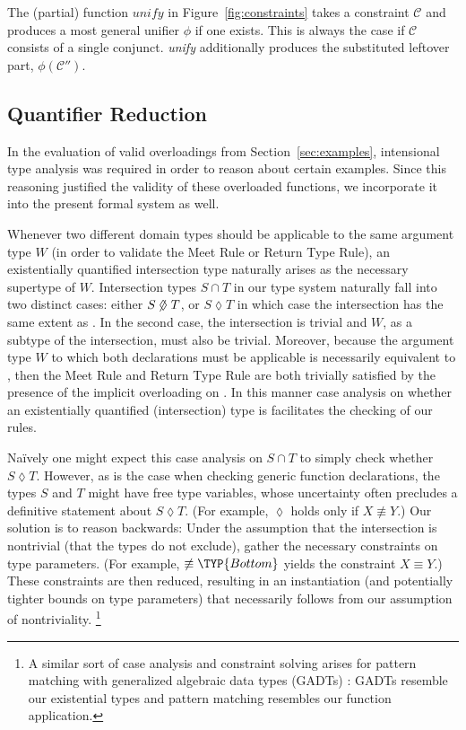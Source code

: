 \documentclass[10pt]{sigplanconf}
\newcommand{\C}{\mathcal{C}}
\newcommand{\exc}{\mathrel{\lozenge}}
\newcommand{\nexc}{\mathrel{\hbox to 0pt{$\mskip -1.4mu\not$\hss}\lozenge}}
\newcommand{\Bottom}{\TYP{Bottom}}
\begin{document}
The (partial) function $\textit{unify}$ in Figure~\ref{fig:constraints} takes a constraint $\C$ and produces a most general unifier $\phi$ if one exists. This is always the case if $\C$ consists of a single conjunct. \textit{unify} additionally produces the substituted leftover
part, $\phi(\C'')$.

\subsection{Quantifier Reduction}
\label{sec:exred}
In the evaluation of valid overloadings from Section~\ref{sec:examples},
intensional type analysis was required in order to reason about certain
examples. Since this reasoning justified
the validity of these overloaded functions, we incorporate it into
the present formal system as well.

Whenever two different domain types should be
applicable to the same argument type $W$ (in order to validate the Meet Rule
or Return Type Rule), an existentially quantified intersection type
naturally arises as the necessary supertype of $W$.
Intersection types $S \cap T$ in our type system naturally fall into two
distinct cases: either $S \nexc T$, or $S \exc T$ in which case the 
intersection has the same extent as \Bottom.
In the second case, the intersection is trivial and $W$, as
a subtype of the intersection, must also be trivial.
Moreover, because the argument type $W$ to which both declarations must be applicable
is necessarily equivalent to \Bottom, then the Meet Rule and Return Type Rule
are both trivially satisfied by the presence of the implicit overloading on
\Bottom. In this manner case analysis on whether an existentially
quantified (intersection) type is \Bottom facilitates the checking of our
rules.

Na\"{i}vely one might expect this case analysis on $S \cap T$ to simply check
whether $S \exc T$. However, as is the case when checking generic
function declarations, the types $S$ and $T$ might have free type variables,
whose uncertainty often precludes a definitive statement about $S \exc T$.
(For example,  $\exc$  holds only if $X \not\equiv Y$.) Our solution is to reason backwards: Under the assumption that the intersection
is nontrivial (that the types do not exclude), gather the necessary
constraints on type parameters. (For example,  $\not\equiv \Bottom$ yields the constraint $X \equiv Y$.) These constraints are then
reduced, resulting in an instantiation (and potentially tighter bounds
on type parameters) that necessarily follows from our assumption of nontriviality.%
\footnote{A similar sort of case analysis and constraint solving
arises for pattern matching with generalized algebraic data types (GADTs) \cite{simonet07}: GADTs resemble our existential types and pattern matching resembles our function application.}
\end{document}
